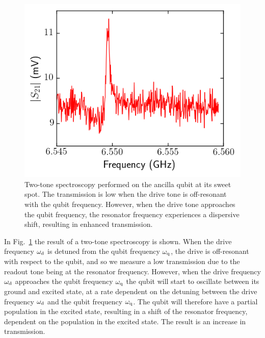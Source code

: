         \begin{figure}
          \begin{center}
          \vspace{-30pt}
            \includegraphics[width=\textwidth]{Figures/Qubit characterization/Spectroscopy.png}
          \end{center}
          \vspace{-20 pt}
          \caption{Two-tone spectroscopy performed on the ancilla qubit at its sweet spot. The transmission is low when the drive tone is off-resonant with the qubit frequency. However, when the drive tone approaches the qubit frequency, the resonator frequency experiences a dispersive shift, resulting in enhanced transmission.}
          \label{fig:qubit spectroscopy}
        \end{figure}
        In Fig.~\ref{fig:qubit spectroscopy} the result of a two-tone spectroscopy is shown. When the drive frequency $\omega_\text{d}$ is detuned from the qubit frequency $\omega_\text{q}$, the drive is off-resonant with respect to the qubit, and so we measure a low transmission due to the readout tone being at the resonator frequency. However, when the drive frequency $\omega_\text{d}$ approaches the qubit frequency $\omega_\text{q}$ the qubit will start to oscillate between its ground and excited state, at a rate dependent on the detuning between the drive frequency $\omega_\text{d}$ and the qubit frequency $\omega_\text{q}$. The qubit will therefore have a partial population in the excited state, resulting in a shift of the resonator frequency, dependent on the population in the excited state. The result is an increase in transmission.

